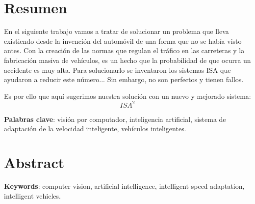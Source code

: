 \chapter{Resumen}

En el siguiente trabajo vamos a tratar de solucionar un problema que lleva existiendo desde la invención del automóvil de una forma que no se había visto antes. Con la creación de las normas que regulan el tráfico en las carreteras y la fabricación masiva de vehículos, es un hecho que la probabilidad de que ocurra un accidente es muy alta. Para solucionarlo se inventaron los sistemas \ac{ISA} \cite{reduccion} que ayudaron a reducir este número... Sin embargo, no son perfectos y tienen fallos.

Es por ello que aquí sugerimos nuestra solución con un nuevo y mejorado sistema: \[ISA^{2}\]

\vspace{0.5cm}

\textbf{Palabras clave}: visión por computador, inteligencia artificial, sistema de adaptación de la velocidad inteligente, vehículos inteligentes.

\newpage
\thispagestyle{empty}
\hspace*{0.5cm}
\newpage

\chapter{Abstract}



\vspace{0.5cm}

\textbf{Keywords}: computer vision, artificial intelligence, intelligent speed adaptation, intelligent vehicles.
\newpage
\thispagestyle{empty}
\hspace*{0.5cm}
\newpage
